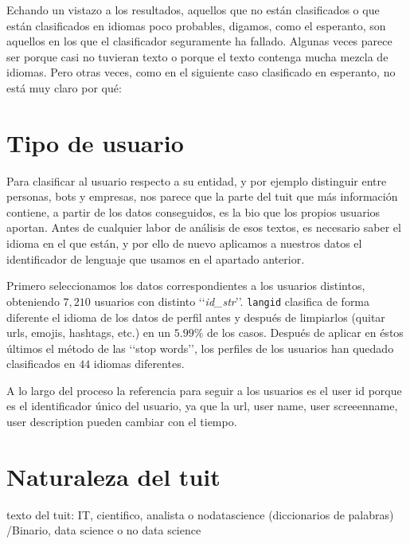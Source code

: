 Echando un vistazo a los resultados, aquellos que no están clasificados o que están
clasificados en idiomas poco probables, digamos, como el esperanto, son aquellos en los
que el clasificador seguramente ha fallado. Algunas veces parece ser porque casi no 
tuvieran texto o porque el texto contenga mucha mezcla de idiomas. Pero otras veces, 
como en el siguiente caso clasificado en esperanto, no está muy claro por qué:



\section{Tipo de usuario}
Para clasificar al usuario respecto a su entidad, y por ejemplo distinguir entre personas, bots y empresas, 
nos parece que la parte del tuit que más información contiene, a partir de los datos conseguidos, es
la bio que los propios usuarios aportan. Antes de cualquier labor de análisis de esos textos,
es necesario saber el idioma en el que están, y por ello de nuevo aplicamos a nuestros datos 
el identificador de lenguaje que usamos en el apartado anterior. 

Primero seleccionamos los datos correspondientes a los usuarios distintos, obteniendo
$7,210$ usuarios con distinto \lq\lq{\em id\_str}\rq\rq. {\tt langid} clasifica de 
forma diferente el idioma de los datos de perfil antes y después de 
limpiarlos (quitar urls, emojis, hashtags, etc.) en un $5.99$\%
de los casos. Después de aplicar en éstos últimos el método de las \lq\lq stop words\rq\rq, 
los perfiles de los usuarios han quedado clasificados en $44$ idiomas diferentes.



A lo largo del proceso la referencia para seguir a los usuarios es el user id porque
es el identificador único del usuario, ya que la url, user name, user screeenname, user description
pueden cambiar con el tiempo.

\section{Naturaleza del tuit}
texto del tuit:  IT, cientifico, analista o nodatascience (diccionarios de palabras)
					/Binario, data science o no data science
